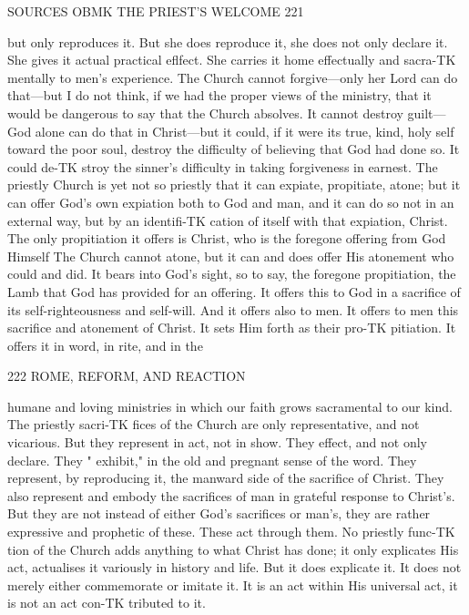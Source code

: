 \documentclass[12pt,a5paper,oneside]{book}
\begin{document}
{{SOURCES OBMK THE PRIEST'S WELCOME 221 

but only reproduces it. But she does reproduce it, she 
does not only declare it. She gives it actual practical 
eflfect. She carries it home effectually and sacra-TK
mentally to men's experience. The Church cannot 
forgive---only her Lord can do that---but I do not 
think, if we had the proper views of the ministry, 
that it would be dangerous to say that the Church 
absolves. It cannot destroy guilt---God alone can do 
that in Christ---but it could, if it were its true, kind, 
holy self toward the poor soul, destroy the difficulty 
of believing that God had done so. It could de-TK
stroy the sinner's difficulty in taking forgiveness in 
earnest. The priestly Church is yet not so priestly 
that it can expiate, propitiate, atone; but it can offer 
God's own expiation both to God and man, and it 
can do so not in an external way, but by an identifi-TK
cation of itself with that expiation, Christ. The only 
propitiation it offers is Christ, who is the foregone 
offering from God Himself The Church cannot 
atone, but it can and does offer His atonement who 
could and did. It bears into God's sight, so to say, 
the foregone propitiation, the Lamb that God has 
provided for an offering. It offers this to God in a 
sacrifice of its self-righteousness and self-will. And it 
offers also to men. It offers to men this sacrifice and 
atonement of Christ. It sets Him forth as their pro-TK
pitiation. It offers it in word, in rite, and in the 



222 ROME, REFORM, AND REACTION 

humane and loving ministries in which our faith 
grows sacramental to our kind. The priestly sacri-TK
fices of the Church are only representative, and not 
vicarious. But they represent in act, not in show. 
They effect, and not only declare. They " exhibit," 
in the old and pregnant sense of the word. They 
represent, by reproducing it, the manward side of the 
sacrifice of Christ. They also represent and embody 
the sacrifices of man in grateful response to Christ's. 
But they are not instead of either God's sacrifices or 
man's, they are rather expressive and prophetic of 
these. These act through them. No priestly func-TK
tion of the Church adds anything to what Christ has 
done; it only explicates His act, actualises it variously 
in history and life. But it does explicate it. It does 
not merely either commemorate or imitate it. It is 
an act within His universal act, it is not an act con-TK
tributed to it. 

}}
\end{document}
